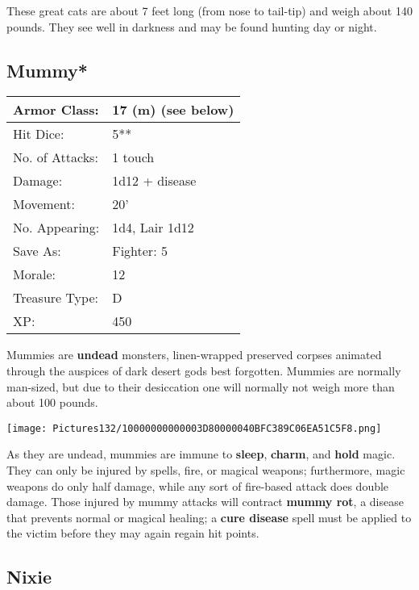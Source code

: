 \documentclass[a4paper,twoside,openany,10pt]{book}
\begin{document}
\begin{multicols}{2}
These great cats are about 7 feet long (from nose to tail-tip) and weigh about 140 pounds. They see well in darkness and may be found hunting day
or night.

\subsection*{Mummy*}\label{mummy}

\begin{tabularx}{0.50\textwidth}{@{}lX@{}} 
Armor Class: & 17 (m) (see below) \\\hline
Hit Dice: & 5** \\\hline
No. of Attacks: & 1 touch \\\hline
Damage: & 1d12 + disease \\\hline
Movement: & 20' \\\hline
No. Appearing: & 1d4, Lair 1d12 \\\hline
Save As: & Fighter: 5 \\\hline
Morale: & 12 \\\hline
Treasure Type: & D \\\hline
XP: & 450 \\\hline
\end{tabularx}\medskip

Mummies are \textbf{undead} monsters, linen-wrapped preserved corpses animated through the auspices of dark desert gods best forgotten. Mummies are normally man-sized, but due to their desiccation one will normally not weigh more than about 100 pounds.


\begin{center} \texttt{[image: Pictures132/10000000000003D80000040BFC389C06EA51C5F8.png]} \end{center}

As they are undead, mummies are immune to \textbf{sleep}, \textbf{charm}, and \textbf{hold} magic. They can only be injured by spells, fire, or magical weapons; furthermore, magic weapons do only half damage, while any sort of fire-based attack does double damage. Those injured by mummy attacks will contract \textbf{mummy rot}, a disease that prevents normal or magical healing; a \textbf{cure disease }spell must be applied to the victim before they may again regain hit points.

\subsection*{Nixie}\label{nixie}


\end{multicols}
\end{document}
